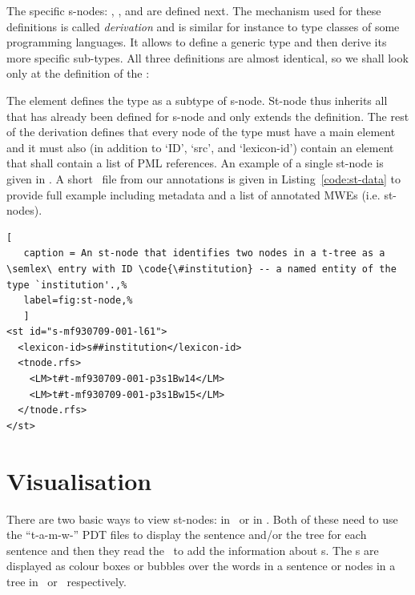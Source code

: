 The specific s-nodes: , , and  are defined next. The mechanism used for these definitions is called \emph{derivation} and is similar for instance to type classes of some programming languages. It allows to define a generic type and then derive its more specific sub-types. All three definitions are almost identical, so we shall look only at the definition of the : 

The element  defines the type  as a subtype of {s-node}. St-node thus inherits all that has already been defined for s-node and only extends the definition. The rest of the derivation defines that every node of the type  must have a main element  and it must also (in addition to `ID', `src', and `lexicon-id') contain an element  that shall contain a list of PML references. An example of a single st-node is given in . A short \sdata\ file from our annotations is given in Listing~\ref{code:st-data} to provide full example including metadata and a list of annotated MWEs (i.e. st-nodes).

\begin{lstlisting}[
   caption = An st-node that identifies two nodes in a t-tree as a \semlex\ entry with ID \code{\#institution} -- a named entity of the type `institution'.,%
   label=fig:st-node,%
   ]
<st id="s-mf930709-001-l61">
  <lexicon-id>s##institution</lexicon-id>
  <tnode.rfs>
    <LM>t#t-mf930709-001-p3s1Bw14</LM>
    <LM>t#t-mf930709-001-p3s1Bw15</LM>
  </tnode.rfs>
</st>
\end{lstlisting}

\section{Visualisation}
\label{sec:s:visual}
There are two basic ways to view st-nodes: in \seman\ or in \tred. Both of these need to use the ``t-a-m-w-'' PDT files to display the sentence and/or the tree for each sentence and then they read the \stf\ to add the information about \stn{}s. The \stn{}s are displayed as colour boxes or bubbles over the words in a sentence or nodes in a tree in \seman\ or \tred\ respectively.

